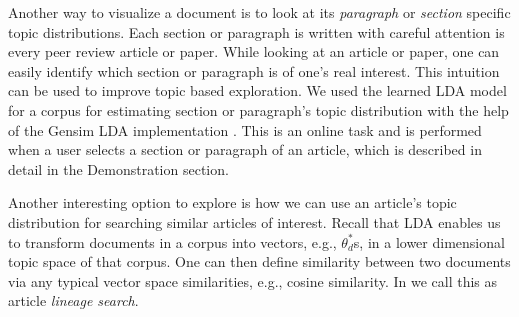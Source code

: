 Another way to visualize a document is to look at its 
\textsl{paragraph} or \textsl{section} specific topic distributions. 
Each section or paragraph is written with careful attention is every 
peer review article or paper. While looking at an article or paper,  
one can easily identify which section or paragraph is of one's real 
interest. This intuition can be used to improve topic based 
exploration. We used the learned LDA model for a corpus for 
estimating section or paragraph's topic distribution with the help 
of the Gensim LDA implementation \cite{rehurek_lrec}. This is an 
online task and is performed when a user selects a section or 
paragraph of an article, which is described in detail in the \system 
Demonstration section.  


Another interesting option to explore is how we can use an article's 
topic distribution for searching similar articles of interest. 
Recall that LDA enables us to transform documents in a corpus into 
vectors, e.g., $\theta^*_{d}$s, in a lower dimensional topic space 
of that corpus. One can then define similarity between two documents 
via any typical vector space similarities, e.g., cosine similarity. 
In \system we call this as article \textsl{lineage search}.         

